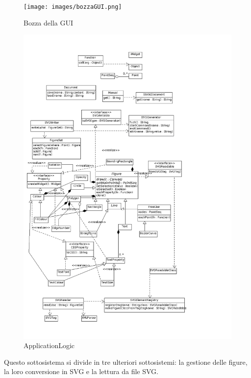 \begin{figure}[!ht]
\centering
\texttt{[image: images/bozzaGUI.png]}
\caption{Bozza della GUI}
\end{figure}

\newpage
{}

\begin{figure}[!ht]
\centering
\includegraphics[scale=0.4]{images/applogic.png}
\caption{ApplicationLogic}
\end{figure}

Questo sottosistema si divide in tre ulteriori sottosistemi: la gestione delle
figure, la loro conversione in SVG e la lettura da file SVG.

